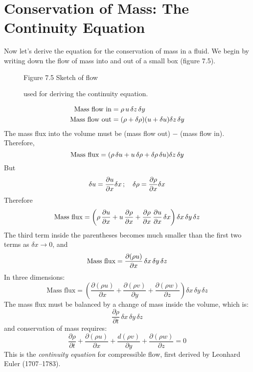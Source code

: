 \section{Conservation of Mass: The Continuity Equation}
Now let's
derive the equation for the conservation of mass in a fluid. We
begin by writing down the flow of mass into and out of a small box
(figure 7.5).
\begin{figure}[h!]
\centering
\footnotesize
Figure 7.5 Sketch of flow \rule{0mm}{4ex}used for deriving the
continuity equation.
\label{fig:continuitysketchR}
\vspace{-3ex}
\end{figure}
\begin{align}
\text{Mass flow in} &= \rho \, u \, \delta z \, \delta y \notag  \\
\text{Mass flow out} &= (\rho + \delta \rho ) (u + \delta u) \delta z \,  \delta y \notag
\end{align}
The mass flux into the volume must be (mass flow out) $-$ (mass flow
in). Therefore,
\begin{equation}
\text{Mass flux} = ( \rho \, \delta u + u \, \delta \rho + \delta \rho \, \delta u)  \delta z \,  \delta y \notag
\end{equation}
But
\begin{equation}
\delta u = \frac{\partial u}{\partial x} \delta x \,;\quad \delta \rho = \frac{\partial {\rho}}{\partial x} \delta x \notag
\end{equation}
Therefore
\begin{equation}
\text{Mass flux} = \left(\rho \, \frac{\partial{u}}{\partial{x}} + u\,\frac{\partial{\rho}}{\partial{x}}
+\frac{\partial{\rho}}{\partial{x}}\,\frac{\partial{u}}{\partial{x}}\,\delta{x}\right)\delta{x}\,\delta{y}\,\delta{z}
\notag
\end{equation}
The third term inside the parentheses becomes much smaller than the first two terms
as $\delta x \rightarrow 0$, and
\begin{equation}
\text{Mass flux} =
\frac{\partial{(\rho{u})}}{\partial{x}}\,\delta{x}\,\delta{y}\,\delta{z} \notag
\end{equation}
In three dimensions:
\begin{displaymath}
\mbox{Mass flux} = \left(\frac{\partial{(\rho{u})}}{\partial{x}} +
\frac{\partial{(\rho{v})}}{\partial{y}} +
\frac{\partial{(\rho{w})}}{\partial{z}}\right)\delta{x}\,\delta{y}\,\delta{z}
\end{displaymath}
The mass flux must be balanced by a change of mass inside the volume, which is:
\begin{displaymath}
\frac{\partial\rho}{\partial{t}}\,\delta{x}\,\delta{y}\,\delta{z}
\end{displaymath}
and conservation of mass requires:
\begin{equation}
\frac{\partial\rho}{\partial{t}} + \frac{\partial{(\rho{u})}}{\partial{x}} + \frac{d(\rho{v})}{\partial{y}} + \frac{\partial{(\rho{w})}}{\partial{z}} = 0
\end{equation}
This is the \textit{continuity equation} for compressible flow, first derived by
Leonhard Euler (1707--1783).

